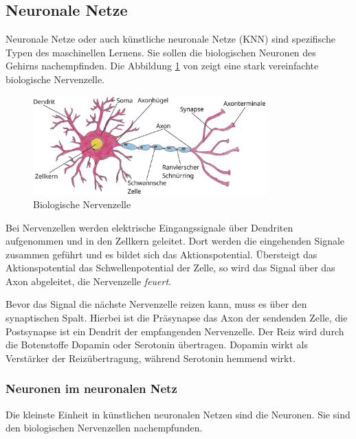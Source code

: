 \subsection{Neuronale Netze}
Neuronale Netze oder auch künstliche neuronale Netze (\acrshort{KNN}) sind spezifische Typen des maschinellen Lernens. Sie sollen die biologischen Neuronen des Gehirns nachempfinden. Die Abbildung \ref{img:biological_neuron} von \cite{pahl-2024} zeigt eine stark vereinfachte biologische Nervenzelle.

\begin{figure}[!ht]
	\includegraphics[width=0.8\textwidth]{content/chapter_basics/images/biological_neuron.eps}
	\centering
	\caption{Biologische Nervenzelle}
	\label{img:biological_neuron}
\end{figure}

Bei Nervenzellen werden elektrische Eingangssignale über Dendriten aufgenommen und in den Zellkern geleitet. Dort werden die eingehenden Signale zusammen geführt und es bildet sich das Aktionspotential. Übersteigt das Aktionspotential das Schwellenpotential der Zelle, so wird das Signal über das Axon abgeleitet, die Nervenzelle \glqq \textit{feuert}\grqq.\vspace{0.2cm}

Bevor das Signal die nächste Nervenzelle reizen kann, muss es über den synaptischen Spalt. Hierbei ist die Präsynapse das Axon der sendenden Zelle, die Postsynapse ist ein Dendrit der empfangenden Nervenzelle. Der Reiz wird durch die Botenstoffe Dopamin oder Serotonin übertragen. Dopamin wirkt als Verstärker der Reizübertragung, während Serotonin hemmend wirkt.

\subsubsection{Neuronen im neuronalen Netz}
Die kleinste Einheit in künstlichen neuronalen Netzen sind die Neuronen. Sie sind den biologischen Nervenzellen nachempfunden. \vspace{0.2cm}


